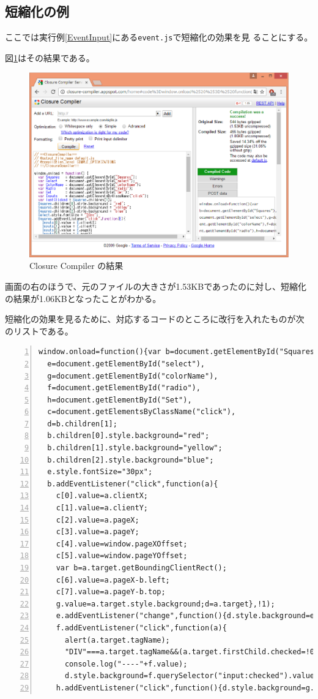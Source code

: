 \subsection{短縮化の例}
ここでは実行例\ref{EventInput}にある\texttt{event.js}で短縮化の効果を見
ることにする。

図\ref{closure-compiler-res02}はその結果である。
 \begin{figure}[ht]
	\begin{center}
	 \includegraphics[width=1\textwidth]{10-01closur-compiler-res02.eps}
	\end{center}
 \caption{Closure Compiler の結果}\label{closure-compiler-res02}
 \end{figure}

 画面の右のほうで、元のファイルの大きさが1.53KBであったのに対し、短縮化
 の結果が1.06KBとなったことがわかる。

 短縮化の効果を見るために、対応するコードのところに改行を入れたものが次
 のリストである。
 \begin{Verbatim}[numbers=left]
window.onload=function(){var b=document.getElementById("Squares"),
  e=document.getElementById("select"),
  g=document.getElementById("colorName"),
  f=document.getElementById("radio"),
  h=document.getElementById("Set"),
  c=document.getElementsByClassName("click"),
  d=b.children[1];
  b.children[0].style.background="red";
  b.children[1].style.background="yellow";
  b.children[2].style.background="blue";
  e.style.fontSize="30px";
  b.addEventListener("click",function(a){
    c[0].value=a.clientX;
    c[1].value=a.clientY;
    c[2].value=a.pageX;
    c[3].value=a.pageY;
    c[4].value=window.pageXOffset;
    c[5].value=window.pageYOffset;
    var b=a.target.getBoundingClientRect();
    c[6].value=a.pageX-b.left;
    c[7].value=a.pageY-b.top;
    g.value=a.target.style.background;d=a.target},!1);
    e.addEventListener("change",function(){d.style.background=e.value},!1);
    f.addEventListener("click",function(a){
      alert(a.target.tagName);
      "DIV"===a.target.tagName&&(a.target.firstChild.checked=!0);
      console.log("----"+f.value);
      d.style.background=f.querySelector("input:checked").value},!1);
    h.addEventListener("click",function(){d.style.background=g.value},!1)};
\end{Verbatim}

